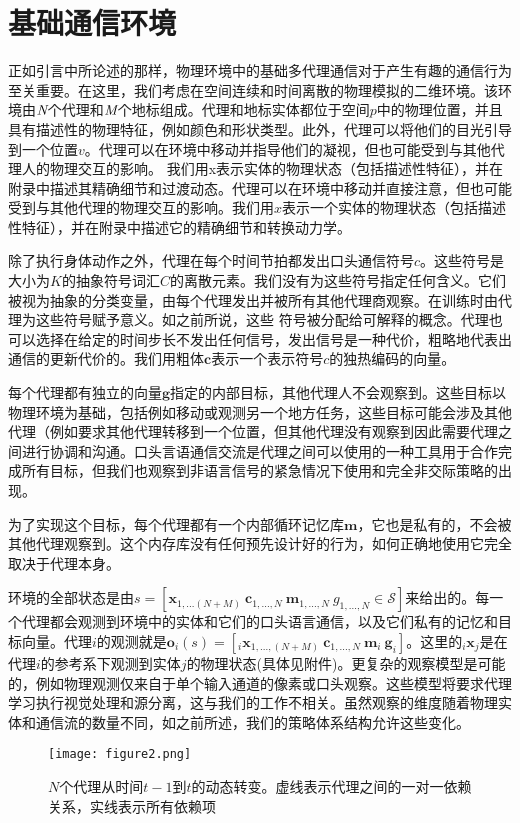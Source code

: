 \section{基础通信环境}
正如引言中所论述的那样，物理环境中的基础多代理通信对于产生有趣的通信行为至关重要。在这里，我们考虑在空间连续和时间离散的物理模拟的二维环境。该环境由$\emph{N}$个代理和$\emph{M}$个地标组成。代理和地标实体都位于空间$p$中的物理位置，并且具有描述性的物理特征，例如颜色和形状类型。此外，代理可以将他们的目光引导到一个位置$v$。代理可以在环境中移动并指导他们的凝视，但也可能受到与其他代理人的物理交互的影响。 我们用x表示实体的物理状态（包括描述性特征），并在附录中描述其精确细节和过渡动态。代理可以在环境中移动并直接注意，但也可能受到与其他代理的物理交互的影响。我们用$x$表示一个实体的物理状态（包括描述性特征），并在附录中描述它的精确细节和转换动力学。
\par
除了执行身体动作之外，代理在每个时间节拍都发出口头通信符号$c$。这些符号是大小为$K$的抽象符号词汇$C$的离散元素。我们没有为这些符号指定任何含义。它们被视为抽象的分类变量，由每个代理发出并被所有其他代理商观察。在训练时由代理为这些符号赋予意义。如之前所说，这些
符号被分配给可解释的概念。代理也可以选择在给定的时间步长不发出任何信号，发出信号是一种代价，粗略地代表出通信的更新代价的。我们用粗体$\textbf{c}$表示一个表示符号$c$的独热编码的向量。
\par
每个代理都有独立的向量$\textbf{g}$指定的内部目标，其他代理人不会观察到。这些目标以物理环境为基础，包括例如移动或观测另一个地方任务，这些目标可能会涉及其他代理（例如要求其他代理转移到一个位置，但其他代理没有观察到因此需要代理之间进行协调和沟通。口头言语通信交流是代理之间可以使用的一种工具用于合作完成所有目标，但我们也观察到非语言信号的紧急情况下使用和完全非交际策略的出现。
\par
为了实现这个目标，每个代理都有一个内部循环记忆库$\textbf{m}$，它也是私有的，不会被其他代理观察到。这个内存库没有任何预先设计好的行为，如何正确地使用它完全取决于代理本身。
\par
环境的全部状态是由$s = [\textbf{x}_{1,...(N + M)}\ \textbf{c}_{1,...,N}\ \textbf{m}_{1,...,N}\ g_{1,...,N}  \in \mathcal{S}]$来给出的。每一个代理都会观测到环境中的实体和它们的口头语言通信，以及它们私有的记忆和目标向量。代理$i$的观测就是$\textbf{o}_i(s) = [_{i}\textbf{x}_{1,...,(N+M)}\ \textbf{c}_{1,...,N}\ \textbf{m}_i\ \textbf{g}_i]$。这里的$_{i}\textbf{x}_j$是在代理$i$的参考系下观测到实体$j$的物理状态(具体见附件)。更复杂的观察模型是可能的，例如物理观测仅来自于单个输入通道的像素或口头观察。这些模型将要求代理学习执行视觉处理和源分离，这与我们的工作不相关。虽然观察的维度随着物理实体和通信流的数量不同，如之前所述，我们的策略体系结构允许这些变化。
\begin{figure}[htb]
	\centering
	\texttt{[image: figure2.png]}
	\caption{$N$个代理从时间$t-1$到$t$的动态转变。虚线表示代理之间的一对一依赖关系，实线表示所有依赖项}\label{fig:代理关系}
\end{figure}


